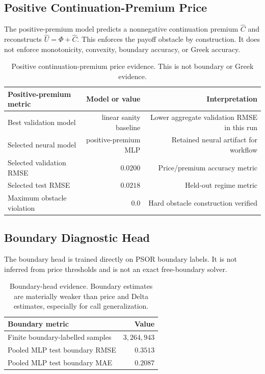 \documentclass[11pt]{article}
\begin{document}
\subsection{Positive Continuation-Premium Price}
The positive-premium model predicts a nonnegative continuation premium
\(\widehat C\) and reconstructs
\(\widehat U=\Phi+\widehat C\). This enforces the payoff obstacle by
construction. It does not enforce monotonicity, convexity, boundary accuracy,
or Greek accuracy.
\begin{table}[h]
\centering
\small
\begin{tabular}{lrr}
\toprule
Positive-premium metric & Model or value & Interpretation \\
\midrule
Best validation model & linear sanity baseline & Lower aggregate validation RMSE in this run \\
Selected neural model & positive-premium MLP & Retained neural artifact for workflow \\
Selected validation RMSE & $0.0200$ & Price/premium accuracy metric \\
Selected test RMSE & $0.0218$ & Held-out regime metric \\
Maximum obstacle violation & $0.0$ & Hard obstacle construction verified \\
\bottomrule
\end{tabular}
\caption{Positive continuation-premium price evidence. This is not boundary or Greek evidence.}
\label{tab:premium}
\end{table}

\subsection{Boundary Diagnostic Head}
The boundary head is trained directly on PSOR boundary labels. It is not inferred from price thresholds and is not an exact free-boundary solver.
\begin{table}[h]
\centering
\small
\begin{tabular}{lr}
\toprule
Boundary metric & Value \\
\midrule
Finite boundary-labelled samples & $3,264,943$ \\
Pooled MLP test boundary RMSE & $0.3513$ \\
Pooled MLP test boundary MAE & $0.2087$ \\
\bottomrule
\end{tabular}
\caption{Boundary-head evidence. Boundary estimates are materially weaker than price and Delta estimates, especially for call generalization.}
\label{tab:boundary}
\end{table}
\end{document}
